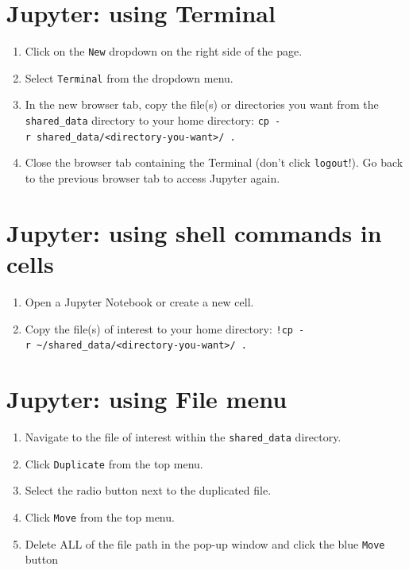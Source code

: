 \documentclass[]{book}
\providecommand{\tightlist}{%
  \setlength{\itemsep}{0pt}\setlength{\parskip}{0pt}}
\begin{document}
\hypertarget{jupyter-using-terminal}{%
\section{Jupyter: using Terminal}\label{jupyter-using-terminal}}

\begin{enumerate}
\def\labelenumi{\arabic{enumi}.}
\tightlist
\item
  Click on the \texttt{New} dropdown on the right side of the page.
\item
  Select \texttt{Terminal} from the dropdown menu.
\item
  In the new browser tab, copy the file(s) or directories you want from the \texttt{shared\_data} directory to your home directory: \texttt{cp\ -r\ shared\_data/\textless{}directory-you-want\textgreater{}/\ .}
\item
  Close the browser tab containing the Terminal (don't click \texttt{logout}!). Go back to the previous browser tab to access Jupyter again.
\end{enumerate}

\hypertarget{jupyter-using-shell-commands-in-cells}{%
\section{Jupyter: using shell commands in cells}\label{jupyter-using-shell-commands-in-cells}}

\begin{enumerate}
\def\labelenumi{\arabic{enumi}.}
\tightlist
\item
  Open a Jupyter Notebook or create a new cell.
\item
  Copy the file(s) of interest to your home directory: \texttt{!cp\ -r\ \textasciitilde{}/shared\_data/\textless{}directory-you-want\textgreater{}/\ .}
\end{enumerate}

\hypertarget{jupyter-using-file-menu}{%
\section{Jupyter: using File menu}\label{jupyter-using-file-menu}}

\begin{enumerate}
\def\labelenumi{\arabic{enumi}.}
\tightlist
\item
  Navigate to the file of interest within the \texttt{shared\_data} directory.
\item
  Click \texttt{Duplicate} from the top menu.
\item
  Select the radio button next to the duplicated file.
\item
  Click \texttt{Move} from the top menu.
\item
  Delete ALL of the file path in the pop-up window and click the blue \texttt{Move} button
\end{enumerate}
\end{document}
